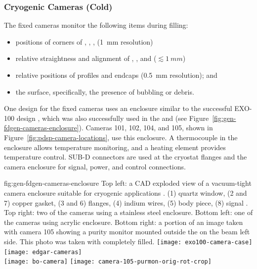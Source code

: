 \subsubsection{Cryogenic Cameras (Cold)}

The fixed cameras
monitor the following items during filling:
\begin{itemize}
\item positions of corners of , , ,  (\SI{1}{mm} resolution)
\item relative straightness and alignment of , , and  (\(\lesssim\SI{1}{mm}\))
\item relative positions of profiles and endcaps (\SI{0.5}{mm} resolution); and 
\item the  surface, specifically, the presence of bubbling or debris.
\end{itemize}




One design for the  fixed cameras uses an enclosure similar to
the successful EXO-100 design \cite{Delaquis:2013hva}, which was also
successfully used in the 
and  (see Figure~\ref{fig:gen-fdgen-cameras-enclosure}). Cameras 101, 102, 104, and 105, shown in Figure~\ref{fig:pdsp-camera-locations}, use this enclosure.
A thermocouple in the enclosure allows temperature monitoring, and a heating element provides temperature control.  
SUB-D connectors are used at the cryostat flanges and the camera enclosure for signal, power, and control connections.

\begin{dunefigure}{fig:gen-fdgen-cameras-enclosure}
  {Top left: a CAD exploded view of a vacuum-tight camera enclosure suitable for cryogenic applications \cite{Delaquis:2013hva}.
    (1) quartz window, (2 and 7) copper gasket, (3 and 6) flanges, (4) indium wires, (5) body piece, (8) signal \fdth.
    Top right: two of the  cameras using a stainless steel enclosure. 
    Bottom left: one of the  cameras using acrylic enclosure.
    Bottom right: a portion of an image taken with  camera 105 showing a purity monitor mounted outside the  on the beam left side. This photo was taken with  completely filled.
  }
  \texttt{[image: exo100-camera-case]}%
  \texttt{[image: edgar-cameras]}\\
  \hfill \texttt{[image: bo-camera]}%
  \hfill \texttt{[image: camera-105-purmon-orig-rot-crop]}%
  \hfill
\end{dunefigure}

